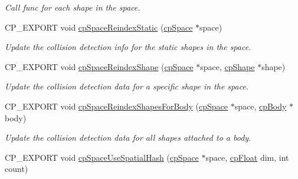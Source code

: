 \begin{DoxyCompactItemize}
\begin{DoxyCompactList}\small\item\em Call {\ttfamily func} for each shape in the space. \end{DoxyCompactList}\item 
\mbox{\label{group__cp_space_ga714f105c977f9006128981fa30d8e7ec}} 
C\+P\+\_\+\+E\+X\+P\+O\+RT void \mbox{\hyperlink{group__cp_space_ga714f105c977f9006128981fa30d8e7ec}{cp\+Space\+Reindex\+Static}} (\mbox{\hyperlink{structcp_space}{cp\+Space}} $\ast$space)
\begin{DoxyCompactList}\small\item\em Update the collision detection info for the static shapes in the space. \end{DoxyCompactList}\item 
\mbox{\label{group__cp_space_gab370e5ee7912ff798bebeb01fc0ba63b}} 
C\+P\+\_\+\+E\+X\+P\+O\+RT void \mbox{\hyperlink{group__cp_space_gab370e5ee7912ff798bebeb01fc0ba63b}{cp\+Space\+Reindex\+Shape}} (\mbox{\hyperlink{structcp_space}{cp\+Space}} $\ast$space, \mbox{\hyperlink{structcp_shape}{cp\+Shape}} $\ast$shape)
\begin{DoxyCompactList}\small\item\em Update the collision detection data for a specific shape in the space. \end{DoxyCompactList}\item 
\mbox{\label{group__cp_space_ga9a141b9c927102b02a84bb2b8631f803}} 
C\+P\+\_\+\+E\+X\+P\+O\+RT void \mbox{\hyperlink{group__cp_space_ga9a141b9c927102b02a84bb2b8631f803}{cp\+Space\+Reindex\+Shapes\+For\+Body}} (\mbox{\hyperlink{structcp_space}{cp\+Space}} $\ast$space, \mbox{\hyperlink{structcp_body}{cp\+Body}} $\ast$body)
\begin{DoxyCompactList}\small\item\em Update the collision detection data for all shapes attached to a body. \end{DoxyCompactList}\item 
\mbox{\label{group__cp_space_gaed394ccafade6346f25e9c78f92bc185}} 
C\+P\+\_\+\+E\+X\+P\+O\+RT void \mbox{\hyperlink{group__cp_space_gaed394ccafade6346f25e9c78f92bc185}{cp\+Space\+Use\+Spatial\+Hash}} (\mbox{\hyperlink{structcp_space}{cp\+Space}} $\ast$space, \mbox{\hyperlink{group__basic_types_gac1ed65573e035bf892505768c852d8d3}{cp\+Float}} dim, int count)

\end{DoxyCompactItemize}
